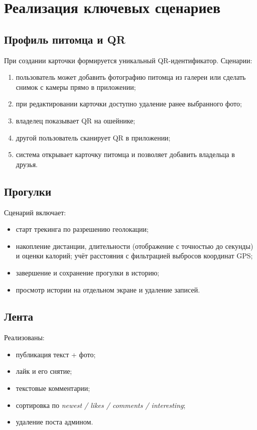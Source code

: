 \documentclass[12pt,a4paper]{article}
\begin{document}
\section{Реализация ключевых сценариев}

\subsection{Профиль питомца и QR}

При создании карточки формируется уникальный QR-идентификатор.  
Сценарии:
\begin{enumerate}
  \item пользователь может добавить фотографию питомца из галереи или сделать снимок с камеры прямо в приложении;
  \item при редактировании карточки доступно удаление ранее выбранного фото;
  \item владелец показывает QR на ошейнике;
  \item другой пользователь сканирует QR в приложении;
  \item система открывает карточку питомца и позволяет добавить владельца в друзья.
\end{enumerate}

\subsection{Прогулки}

Сценарий включает:
\begin{itemize}
  \item старт трекинга по разрешению геолокации;
  \item накопление дистанции, длительности (отображение с точностью до секунды) и оценки калорий; учёт расстояния с фильтрацией выбросов координат GPS;
  \item завершение и сохранение прогулки в историю;
  \item просмотр истории на отдельном экране и удаление записей.
\end{itemize}

\subsection{Лента}

Реализованы:
\begin{itemize}
  \item публикация текст + фото;
  \item лайк и его снятие;
  \item текстовые комментарии;
  \item сортировка по \textit{newest / likes / comments / interesting};
  \item удаление поста админом.
\end{itemize}
\end{document}
